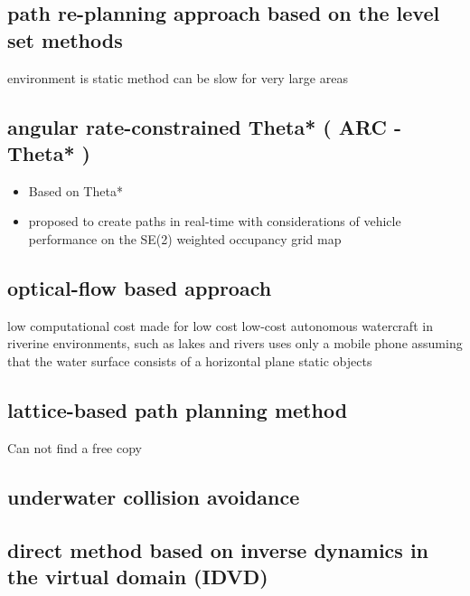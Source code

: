 \subsection{path re-planning approach based on the level set methods }\cite{xu2013fast}
\begin{itemize}
    \con environment is static
    \con method can be slow for very large areas
\end{itemize}
\subsection{angular rate-constrained  Theta* ( ARC - Theta* )  }\cite{kim2014angular}
\begin{itemize}
    \con Does not consider colreg atm (future work)
    \pro  considering both angular rate (yaw rate) and heading angle of unmanned surface vehicles (USVs)
    \item Based on Theta*
    \item  proposed to create paths in real-time with considerations of vehicle performance on the SE(2) weighted occupancy grid map
\end{itemize}

\subsection{optical-flow based approach }\cite{el2013visual}
\begin{itemize}
    \pro low computational cost
    \con made for low cost low-cost autonomous watercraft in riverine environments, such as lakes and rivers
    \con uses only a mobile phone
    \con assuming that the water surface consists of a horizontal plane
    \con static objects
\end{itemize}

\subsection{lattice-based path planning method }\cite{bertaska2013experimental}
\begin{itemize}
    \con Can not find a free copy
\end{itemize}

\subsection{underwater collision avoidance}\cite{heidarsson2011obstacle,onunka2013probabilistic}


\subsection{direct method based on inverse dynamics in the virtual domain (IDVD) }\cite{yakimenko2011real}



